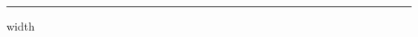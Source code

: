 %
\def\cals@framecs@width{1.2pt }
\def\cals@framers@width{1.2pt }
%
\hrule width\hsize \vskip10pt
\begin{calstable}
\colwidths{{60pt}{120pt}}
\brow {}      \erow
\brow {}     \erow
\end{calstable}
